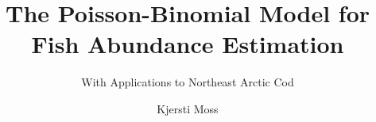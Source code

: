 \documentclass[a4paper]{report}
\author{Kjersti Moss}
\title{The Poisson-Binomial Model for Fish Abundance Estimation}
\subtitle{With Applications to Northeast Arctic Cod}
\begin{document}
	\masterfrontpage
    \afterpage{\null\newpage}
\end{document}
